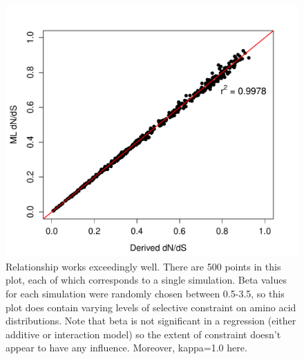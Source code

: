 \documentclass[11pt]{article}
\begin{document}
\begin{figure}[H]
\centerline{\includegraphics[width=6in]{figures/simpleregression.pdf}}
\caption{\label{simple} Relationship works exceedingly well. There are 500 points in this plot, each of which corresponds to a single simulation. Beta values for each simulation were randomly chosen between 0.5-3.5, so this plot does contain varying levels of selective constraint on amino acid distributions. Note that beta is not significant in a regression (either additive or interaction model) so the extent of constraint doesn't appear to have any influence. Moreover, kappa=1.0 here.}
\end{figure}

	
	
	
\end{document}
